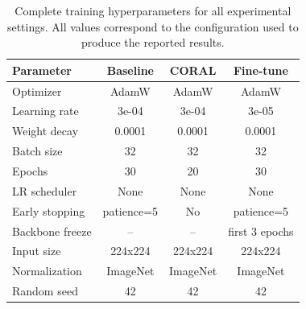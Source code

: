 \begin{table}[htbp]
\centering
\caption{Complete training hyperparameters for all experimental settings. All values correspond to the configuration used to produce the reported results.}
\label{tab:hyperparams}
\begin{tabular}{lccc}
\toprule
Parameter & Baseline & CORAL & Fine-tune \\
\midrule
Optimizer & AdamW & AdamW & AdamW \\
Learning rate & 3e-04 & 3e-04 & 3e-05 \\
Weight decay & 0.0001 & 0.0001 & 0.0001 \\
Batch size & 32 & 32 & 32 \\
Epochs & 30 & 20 & 30 \\
LR scheduler & None & None & None \\
Early stopping & patience=5 & No & patience=5 \\
Backbone freeze & -- & -- & first 3 epochs \\
Input size & 224x224 & 224x224 & 224x224 \\
Normalization & ImageNet & ImageNet & ImageNet \\
Random seed & 42 & 42 & 42 \\
\bottomrule
\end{tabular}
\end{table}